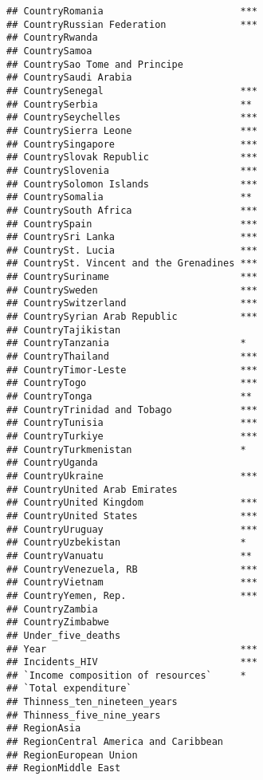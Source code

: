 \documentclass[
]{article}
\begin{document}
\begin{verbatim}
## CountryRomania                        ***
## CountryRussian Federation             ***
## CountryRwanda                            
## CountrySamoa                             
## CountrySao Tome and Principe             
## CountrySaudi Arabia                      
## CountrySenegal                        ***
## CountrySerbia                         ** 
## CountrySeychelles                     ***
## CountrySierra Leone                   ***
## CountrySingapore                      ***
## CountrySlovak Republic                ***
## CountrySlovenia                       ***
## CountrySolomon Islands                ***
## CountrySomalia                        ** 
## CountrySouth Africa                   ***
## CountrySpain                          ***
## CountrySri Lanka                      ***
## CountrySt. Lucia                      ***
## CountrySt. Vincent and the Grenadines ***
## CountrySuriname                       ***
## CountrySweden                         ***
## CountrySwitzerland                    ***
## CountrySyrian Arab Republic           ***
## CountryTajikistan                        
## CountryTanzania                       *  
## CountryThailand                       ***
## CountryTimor-Leste                    ***
## CountryTogo                           ***
## CountryTonga                          ** 
## CountryTrinidad and Tobago            ***
## CountryTunisia                        ***
## CountryTurkiye                        ***
## CountryTurkmenistan                   *  
## CountryUganda                            
## CountryUkraine                        ***
## CountryUnited Arab Emirates              
## CountryUnited Kingdom                 ***
## CountryUnited States                  ***
## CountryUruguay                        ***
## CountryUzbekistan                     *  
## CountryVanuatu                        ** 
## CountryVenezuela, RB                  ***
## CountryVietnam                        ***
## CountryYemen, Rep.                    ***
## CountryZambia                            
## CountryZimbabwe                          
## Under_five_deaths                        
## Year                                  ***
## Incidents_HIV                         ***
## `Income composition of resources`     *  
## `Total expenditure`                      
## Thinness_ten_nineteen_years              
## Thinness_five_nine_years                 
## RegionAsia                               
## RegionCentral America and Caribbean      
## RegionEuropean Union                     
## RegionMiddle East                        

\end{verbatim}
\end{document}
